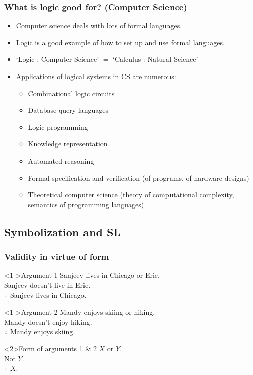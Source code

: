 \begin{frame}
  \frametitle{What is logic good for? (Computer Science)}

  \begin{itemize}[<+->]
    \item Computer science deals with lots of formal languages.
    \item Logic is a good example of how to set up and use formal languages.
    \item `Logic : Computer Science' $=$ `Calculus : Natural Science'
    \item Applications of logical systems in CS are numerous:
  \begin{itemize}[<+->]
  \item Combinational logic circuits
  \item Database query languages
  \item Logic programming
  \item Knowledge representation
  \item Automated reasoning
  \item Formal specification and verification (of programs, of hardware designs)
  \item Theoretical computer science (theory of computational
  complexity, semantics of programming languages)
 \end{itemize}
\end{itemize}

\end{frame}

\subsection{Symbolization and SL}

\begin{frame}
  \frametitle{Validity in virtue of form}

  \begin{block}<1->{Argument 1}
  Sanjeev lives in Chicago or Erie.\\
  Sanjeev doesn't live in Erie.\\
  $\therefore$ Sanjeev lives in Chicago.
  \end{block}

  \begin{block}<1->{Argument 2}
  Mandy enjoys skiing or hiking.\\
  Mandy doesn't enjoy hiking.\\
  $\therefore$ Mandy enjoys skiing.
  \end{block}

  \begin{block}<2>{Form of arguments 1 \& 2}
  $X$ or $Y$.\\
  Not $Y$.\\
  $\therefore$ $X$.
  \end{block}

\end{frame}

